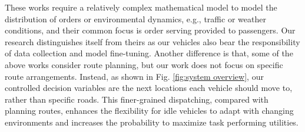 These works require a relatively complex mathematical model to model the distribution of orders or environmental dynamics, e.g., traffic or weather conditions, and their common focus is order serving provided to passengers. Our research distinguishes itself from theirs as our vehicles also bear the responsibility of data collection and model fine-tuning. Another difference is that, some of the above works consider route planning, but our work does not focus on specific route arrangements. Instead, as shown in Fig. \ref{fig:system overview}, our controlled decision variables are the next locations each vehicle should move to, rather than specific roads. This finer-grained dispatching, compared with planning routes, enhances the flexibility for idle vehicles to adapt with changing environments and increases the probability to maximize task performing utilities. 



